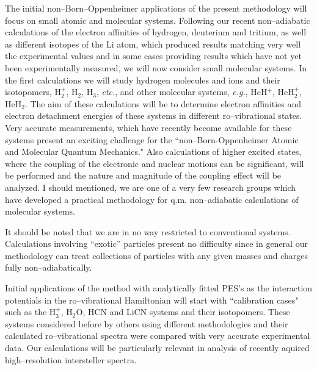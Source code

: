 The initial non--Born--Oppenheimer
applications of the present methodology
will focus on
small atomic and molecular systems.
Following our recent non--adiabatic calculations
of the electron affinities of hydrogen, deuterium and tritium,
as well as different isotopes of the Li atom,
which produced results matching very well the experimental
values and in some cases providing results which have not 
yet been experimentally measured, we will now
consider small molecular systems.
In the first calculations
we will study
hydrogen molecules and ions and their isotopomers,
H$_2^+$, H$_2$, H$_3$, {\it etc.},
and other molecular systems, {\it e.g.}, HeH$^+$, HeH$_2^+$, HeH$_2$.
The aim of these calculations will be to determine
electron affinities and electron detachment energies
of these systems in different ro--vibrational states.
Very accurate measurements, which have
recently become
available
for these systems
present an exciting challenge for
the ``non--Born-Oppenheimer Atomic and Molecular Quantum Mechanics."
Also calculations of
higher excited states,
where the coupling of the electronic and nuclear motions
can be significant,
will be performed and the nature and magnitude of the
coupling effect will be
analyzed. I should mentioned, we are one of a very few research
groups which have developed a practical methodology for
q.m. non--adiabatic calculations of molecular systems.

It should be noted that we are in no way restricted to conventional
systems.
Calculations involving ``exotic'' particles present no difficulty
since in general our methodology can treat collections of particles
with any given masses and charges fully non--adiabatically.

Initial applications of the method with
analytically fitted PES's as the
interaction potentials
in the ro--vibrational Hamiltonian
will start with
``calibration cases"
such as the H$_3^+$, H$_2$O, HCN and LiCN systems and their
isotopomers.
These systems considered before by others
using different methodologies
and their calculated ro--vibrational spectra
were compared with very accurate experimental data.
Our calculations will be particularly relevant
in analysis of
recently aquired high--resolution
intersteller spectra.

